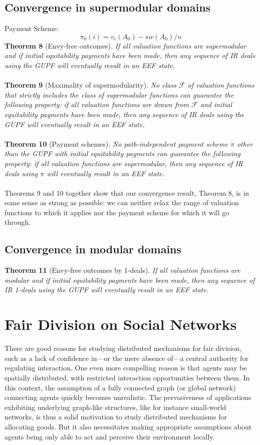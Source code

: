 \documentclass{article}
\begin{document}
\subsection{Convergence in supermodular domains}
Payment Scheme:
$$ \pi_{0}(i) = v_{i}(A_{0}) - sw(A_{0})/n$$
\textbf{Theorem 8} (Envy-free outcomes). \textit{If all valuation functions are supermodular and if initial equitability
payments have been made, then any sequence of IR deals using the GUPF will eventually result in an EEF
state.}\\
\\
\textbf{Theorem 9} (Maximality of supermodularity). \textit{No class $\mathcal{F}$ of valuation functions that strictly includes the class of supermodular functions can guarantee the following property: if all valuation functions are drawn
from $\mathcal{F}$ and initial equitability payments have been made, then any sequence of IR deals using the GUPF
will eventually result in an EEF state.}\\
\\
\textbf{Theorem 10} (Payment schemes). \textit{No path-independent payment scheme $\pi$ other than the GUPF with initial
equitability payments can guarantee the following property: if all valuation functions are supermodular, then
any sequence of IR deals using $\pi$ will eventually result in an EEF state.}\\
\\
 Theorems 9 and 10 together show that our convergence result, Theorem 8, is in some sense as strong as possible: we can neither relax the range of valuation functions to which it applies nor the payment scheme for which it will go through.
\subsection{Convergence in modular domains}
\textbf{Theorem 11} (Envy-free outcomes by 1-deals). \textit{If all valuation functions are modular and if initial equitability payments have been made, then any sequence of IR 1-deals using the GUPF will eventually result in
an EEF state.}
\section{Fair Division on Social Networks}
There are good reasons for studying distributed mechanisms for fair division, such as a lack of confidence in—or the mere absence of—a central authority for regulating interaction. One even more compelling reason is that agents may be spatially distributed, with restricted interaction opportunities between them. In this context, the assumption of a fully connected graph (or global network) connecting  agents  quickly  becomes  unrealistic. The  pervasiveness  of  applications  exhibiting  underlying graph-like structures, like for instance small-world networks, is thus a solid motivation to study distributed mechanisms  for  allocating  goods. But it  also necessitates making appropriate assumptions about agents being only able to act and perceive their environment locally.
\end{document}
